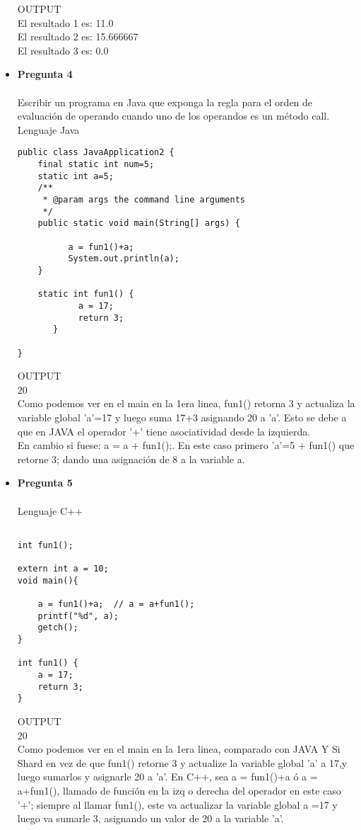 \documentclass[12pt,oneside]{article}
\begin{document}
\begin{itemize}
OUTPUT\\
El resultado 1 es: 11.0\\
El resultado 2 es: 15.666667\\
El resultado 3 es: 0.0\\


\item {\bf Pregunta 4} \\\\
Escribir un programa en Java que exponga la regla para el orden de evaluación de operando cuando uno de los operandos es un método call.\\
Lenguaje Java\\
\begin{lstlisting}[frame=single]  % Start your code-block
public class JavaApplication2 {
    final static int num=5;
    static int a=5;
    /**
     * @param args the command line arguments
     */
    public static void main(String[] args) {
        
          a = fun1()+a; 
          System.out.println(a); 
    }

    static int fun1() {
            a = 17;
            return 3;
       }

}

\end{lstlisting}
OUTPUT\\
20\\
Como podemos ver en el main en la 1era linea, fun1() retorna 3 y actualiza la variable global 'a'=17 y luego suma 17+3 asignando 20 a 'a'. Esto se debe a que en JAVA el operador '+' tiene asociatividad desde la izquierda.\\
En cambio si fuese:  a = a + fun1();. En este caso primero 'a'=5 + fun1() que retorne 3; dando una asignación de 8 a la variable a.

\item {\bf Pregunta 5} \\\\
Lenguaje C++
\begin{lstlisting}[frame=single]  % Start your code-block

int fun1();

extern int a = 10;
void main(){
	
	a = fun1()+a;  // a = a+fun1();
	printf("%d", a);
	getch();
}

int fun1() {
	a = 17;
	return 3;
}
\end{lstlisting}

OUTPUT\\
20\\
Como podemos ver en el main en la 1era linea, comparado con JAVA Y Si Shard en vez de que fun1() retorne 3 y actualize la variable global 'a' a 17,y luego sumarlos y asignarle 20 a 'a'. En C++, sea a = fun1()+a  ó  a = a+fun1(), llamado de función en la izq o derecha del operador en este caso '+'; siempre al llamar fun1(), este va actualizar la variable global a =17 y luego va sumarle 3, asignando un valor de 20 a  la variable 'a'. 



\end{itemize}
\end{document}
